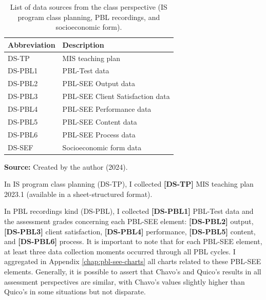 \begin{table}[htb]
\caption{List of data sources from the class perspective (\acrshort{IS} program class planning, \acrshort{PBL} recordings, and socioeconomic form).}
\label{tbl:class-data-sources}
\centering
{}
\begin{tabular}{
    >{\centering\arraybackslash}m{3cm}|
    >{\centering\arraybackslash}m{7cm}
}
    \hline
    \textbf{Abbreviation} &
    \textbf{Description} \\
    
    \hline
    \acrshort{DS-TP} &
    \acrshort{MIS} teaching plan \\
    
    \hline
    \acrshort{DS-PBL}1 &
    \acrshort{PBL}-Test data \\
    
    \acrshort{DS-PBL}2 &
    \acrshort{PBL-SEE} Output data \\

    \acrshort{DS-PBL}3 &
    \acrshort{PBL-SEE} Client Satisfaction data \\

    \acrshort{DS-PBL}4 &
    \acrshort{PBL-SEE} Performance data\\

    \acrshort{DS-PBL}5 &
    \acrshort{PBL-SEE} Content data\\

    \acrshort{DS-PBL}6 &
    \acrshort{PBL-SEE} Process data\\

    \hline
    \acrshort{DS-SEF} &
    Socioeconomic form data\\
    
    \hline
    
\end{tabular}

\medskip\ABNTEXfontereduzida\selectfont\textbf{Source:} Created by the author (2024). \par\medskip

\end{table}

In \gls{IS} program class planning (\acrfull{DS-TP}), I collected \textbf{[DS-TP]} \gls{MIS} teaching plan 2023.1 (available in a sheet-structured format).

In \gls{PBL} recordings kind (\acrfull{DS-PBL}), I collected \textbf{[DS-PBL1]} \gls{PBL}-Test data and the assessment grades concerning each \gls{PBL-SEE} element: \textbf{[DS-PBL2]} output, \textbf{[DS-PBL3]} client satisfaction, \textbf{[DS-PBL4]} performance, \textbf{[DS-PBL5]} content, and \textbf{[DS-PBL6]} process. It is important to note that for each \gls{PBL-SEE} element, at least three data collection moments occurred through all \gls{PBL} cycles. I aggregated in Appendix \ref{chap:pbl-see-charts} all charts related to these \gls{PBL-SEE} elements. Generally, it is possible to assert that Chavo's and Quico's results in all assessment perspectives are similar, with Chavo's values slightly higher than Quico's in some situations but not disparate.

